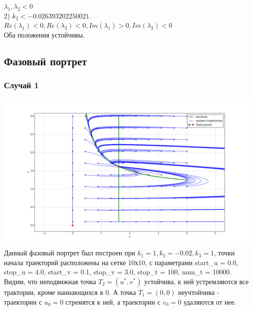 \documentclass[oneside, final, 12pt]{article}
\begin{document}
\(
\lambda_1, \lambda_2 < 0
\)\\

2) \(k_2 < -0.026393202250021 \).\\

\( Re(\lambda_1)<0, Re(\lambda_2)<0, Im(\lambda_1)>0, Im(\lambda_2)<0 \)\\

Оба положения устойчивы.\\

\subsection{Фазовый портрет}

\subsubsection{Случай 1}
\includegraphics[width=1\textwidth]{figure_2.png}\\
Данный фазовый портрет был построен при \(k_1 = 1,k_2 = -0.02,k_3 = 1\), точки начала траекторий расположены на сетке 10х10, с параметрами start_u = 0.0, stop_u = 4.0, start_v = 0.1, stop_v = 3.0, stop_t = 100, num_t = 10000.\\

Видим, что неподвижная точка \( T_2 = (u^*, v^*)\) устойчива, к ней устремляются все трактории, кроме наинающихся в 0. А точка \( T_1 = (0,0)\) неучтойчива - траектории с \(u_0 = 0\) стремятся к ней, а траектории с \(v_0 = 0\) удаляются от нее.
\end{document}
